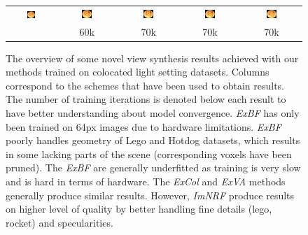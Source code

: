 \begin{figure}[!htb]
\begin{tabular*}{0.99\textwidth}{ c c c c c }
        \includegraphics[width=0.19\textwidth]{figures/results/col_set/hotdog2_targ_256px.png}
        &
        \includegraphics[width=0.19\textwidth]{figures/results/col_set/hotdog2_imnf_57k.png}
        &
        \includegraphics[width=0.19\textwidth]{figures/results/col_set/hotdog2_excol_150k.png}
        &
        \includegraphics[width=0.19\textwidth]{figures/results/col_set/hotdog2_exva_67k.png}
        &
        \includegraphics[width=0.19\textwidth]{figures/results/col_set/hotdog2_exbf_68k.png}
        \\ [-5pt]
        & 60k & 70k & 70k & 70k \\
        

    \end{tabular*}
    \caption{The overview of some novel view synthesis results achieved with our methods trained on colocated light setting datasets.
    Columns correspond to the schemes that have been used to obtain results.
    The number of training iterations is denoted below each result to have better understanding about model convergence.
    \textit{ExBF} has only been trained on 64px images due to hardware limitations.
    \textit{ExBF} poorly handles geometry of Lego and Hotdog datasets,
    which results in some lacking parts of the scene
    (corresponding voxels have been pruned).
    The \textit{ExBF} are generally underfitted as training is very slow and is hard in terms of hardware.
    The \textit{ExCol} and \textit{ExVA} methods generally produce similar results.
    However, \textit{ImNRF} produce results on higher level of quality
    by better handling fine details (lego, rocket) and specularities.
    }
    \label{tab:coloc_allresults}
\end{figure}
\endgroup